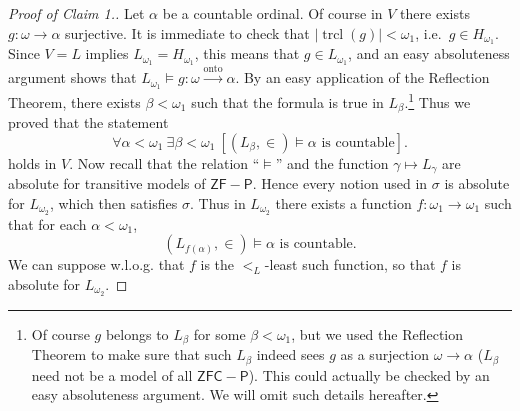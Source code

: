 \documentclass[11pt,a4paper]{report}
\theoremstyle{definition}
\theoremstyle{num.custom-title}
\theoremstyle{custom-title}
\DeclareMathOperator{\trcl}{trcl}
\newcommand{\onto}{\xrightarrow{\text{onto}}}
\begin{document}
\begin{proof}[Proof of Claim 1.]
\renewcommand{\qedsymbol}{$\blacksquare$}
Let $\alpha$ be a countable ordinal. Of course in $V$ there exists $g \colon \omega \to \alpha$ surjective. It is immediate to check that $|{\trcl(g)}| < \omega_1$, i.e.\ $g \in H_{\omega_1}$. Since $V=L$ implies $L_{\omega_1} = H_{\omega_1}$, this means that $g \in L_{\omega_1}$, and an easy absoluteness argument shows that $L_{\omega_1} \models g \colon \omega \onto \alpha$. By an easy application of the Reflection Theorem, there exists $\beta < \omega_1$ such that the formula is true in $L_\beta$.\footnote{Of course $g$ belongs to $L_\beta$ for some $\beta < \omega_1$, but we used the Reflection Theorem to make sure that such $L_\beta$ indeed sees $g$ as a surjection $\omega \to \alpha$ ($L_\beta$ need not be a model of all $\mathsf{ZFC - P}$). This could actually be checked by an easy absoluteness argument. We will omit such details hereafter.} Thus we proved that the statement
\[
\forall \alpha < \omega_1 \ \exists \beta < \omega_1 \ [ (L_\beta, \in) \models \alpha \text{ is countable}]. \tag{$\sigma$}
\]
holds in $V$. Now recall that the relation ``$\models$'' and the function $\gamma \mapsto L_\gamma$ are absolute for transitive models of $\mathsf{ZF-P}$. Hence every notion used in $\sigma$ is absolute for $L_{\omega_2}$, which then satisfies $\sigma$. Thus in $L_{\omega_2}$ there exists a function $f \colon \omega_1 \to \omega_1$ such that for each $\alpha < \omega_1$,
\[
(L_{f(\alpha)}, \in) \models \alpha \text{ is countable}.
\]
We can suppose w.l.o.g. that $f$ is the $<_L$-least such function, so that $f$ is absolute for $L_{\omega_2}$.
\end{proof}
\end{document}
